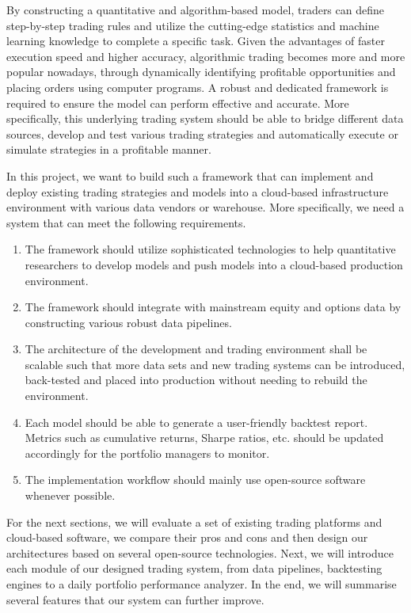 \documentclass[12pt]{article}
\begin{document}
By constructing a quantitative and algorithm-based model, traders can define step-by-step trading rules and utilize the cutting-edge statistics and machine learning knowledge to complete a specific task. Given the advantages of faster execution speed and higher accuracy, algorithmic trading becomes more and more popular nowadays, through dynamically identifying profitable opportunities and placing orders using computer programs.  A  robust and dedicated framework is required to ensure the model can perform effective and accurate. More specifically, this underlying trading system should be able to bridge different data sources, develop and test various trading strategies and automatically execute or simulate strategies in a profitable manner.

In this project, we want to build such a framework that can implement and deploy existing trading strategies and models into a cloud-based infrastructure environment with various data vendors or warehouse. More specifically, we need a system that can meet the following requirements.

\begin{enumerate}
    \item The framework should utilize sophisticated technologies to help quantitative researchers to develop models and push models into a cloud-based production environment.
    \item The framework should integrate with mainstream equity and options data by constructing various robust data pipelines.
    \item The architecture of the development and trading environment shall be scalable such that more data sets and new trading systems can be introduced, back-tested and placed into production without needing to rebuild the environment.
    \item Each model should be able to generate a user-friendly backtest report. Metrics such as cumulative returns, Sharpe ratios, etc. should be updated accordingly for the portfolio managers to monitor.
    \item The implementation workflow should mainly use open-source software whenever possible. 
\end{enumerate}

For the next sections, we will evaluate a set of existing trading platforms and cloud-based software, we compare their pros and cons and then design our architectures based on several open-source technologies. Next, we will introduce each module of our designed trading system, from data pipelines, backtesting engines to a daily portfolio performance analyzer. In the end, we will summarise several features that our system can further improve. 
\end{document}
